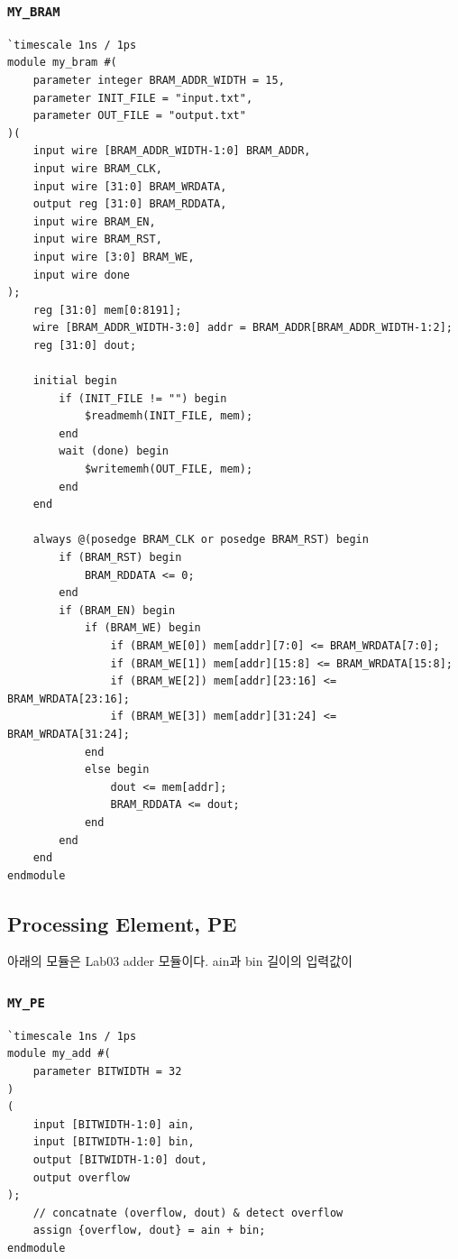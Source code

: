 \documentclass{article}
\begin{document}
\subsubsection*{\texttt{MY\_BRAM}}
\begin{lstlisting}[style={verilog-style}]
`timescale 1ns / 1ps
module my_bram #(
    parameter integer BRAM_ADDR_WIDTH = 15,
    parameter INIT_FILE = "input.txt",
    parameter OUT_FILE = "output.txt"
)(
    input wire [BRAM_ADDR_WIDTH-1:0] BRAM_ADDR,
    input wire BRAM_CLK,
    input wire [31:0] BRAM_WRDATA,
    output reg [31:0] BRAM_RDDATA,
    input wire BRAM_EN,
    input wire BRAM_RST,
    input wire [3:0] BRAM_WE,
    input wire done
);
    reg [31:0] mem[0:8191];
    wire [BRAM_ADDR_WIDTH-3:0] addr = BRAM_ADDR[BRAM_ADDR_WIDTH-1:2];
    reg [31:0] dout;
    
    initial begin
        if (INIT_FILE != "") begin
            $readmemh(INIT_FILE, mem);
        end
        wait (done) begin
            $writememh(OUT_FILE, mem);
        end
    end
    
    always @(posedge BRAM_CLK or posedge BRAM_RST) begin
        if (BRAM_RST) begin 
            BRAM_RDDATA <= 0;
        end
        if (BRAM_EN) begin
            if (BRAM_WE) begin
                if (BRAM_WE[0]) mem[addr][7:0] <= BRAM_WRDATA[7:0];
                if (BRAM_WE[1]) mem[addr][15:8] <= BRAM_WRDATA[15:8];
                if (BRAM_WE[2]) mem[addr][23:16] <= BRAM_WRDATA[23:16];
                if (BRAM_WE[3]) mem[addr][31:24] <= BRAM_WRDATA[31:24]; 
            end
            else begin
                dout <= mem[addr];
                BRAM_RDDATA <= dout;
            end
        end
    end
endmodule
\end{lstlisting}

\newpage
\subsection{Processing Element, PE}

아래의 모듈은 Lab03 adder 모듈이다. ain과 bin 길이의 입력값이 

\subsubsection*{\texttt{MY\_PE}}
\begin{lstlisting}[style={verilog-style}]
`timescale 1ns / 1ps
module my_add #(
    parameter BITWIDTH = 32
)
(
    input [BITWIDTH-1:0] ain,
    input [BITWIDTH-1:0] bin,
    output [BITWIDTH-1:0] dout,
    output overflow
);
    // concatnate (overflow, dout) & detect overflow
    assign {overflow, dout} = ain + bin;
endmodule
\end{lstlisting}
\end{document}

